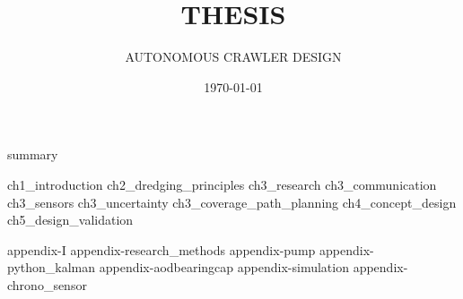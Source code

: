 \documentclass[english, businessunit=mti, status=final]{IHCreport}
\title{THESIS}
\subtitle{AUTONOMOUS CRAWLER DESIGN}
\date{\today}
\begin{document}

%
\begin{front}[]
 {summary}
\end{front}

\begin{main}
 {ch1_introduction}
 {ch2_dredging_principles}
 {ch3_research}
 {ch3_communication}
 {ch3_sensors}
 {ch3_uncertainty}
 {ch3_coverage_path_planning}
 {ch4_concept_design}
 {ch5_design_validation}
\end{main}

\begin{back}[]
 \printglossaries
 \printbibliography[title={BIBLIOGRAPHY}]
 \begin{app}
  {appendix-I}
  {appendix-research_methods}
  {appendix-pump}
  {appendix-python_kalman}
  {appendix-aodbearingcap}
  {appendix-simulation}
  {appendix-chrono_sensor}
 \end{app}
\end{back}
\end{document}
